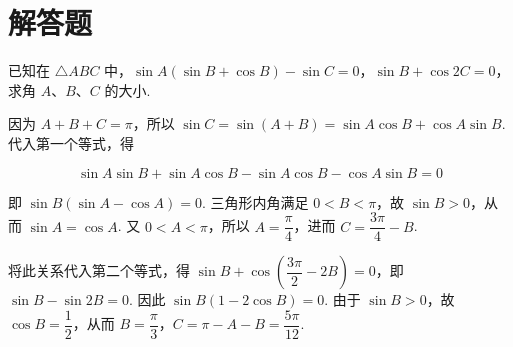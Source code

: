 \section{解答题}
\begin{problem}
已知在 \(\triangle ABC\) 中，\(\sin A (\sin B + \cos B) - \sin C = 0\)，\(\sin B + \cos 2C = 0\)，求角 \(A\)、\(B\)、\(C\) 的大小.

\begin{solution}
因为 \(A+B+C=\pi\)，所以 \(\sin C=\sin(A+B)=\sin A\cos B+\cos A\sin B\). 代入第一个等式，得

\[
\sin A\sin B+\sin A\cos B-\sin A\cos B-\cos A\sin B=0
\]

即 \(\sin B(\sin A-\cos A)=0\). 三角形内角满足 \(0<B<\pi\)，故 \(\sin B>0\)，从而 \(\sin A=\cos A\). 又 \(0<A<\pi\)，所以 \(A=\dfrac{\pi}{4}\)，进而 \(C=\dfrac{3\pi}{4}-B\).

将此关系代入第二个等式，得 \(\sin B+\cos\left(\dfrac{3\pi}{2}-2B\right)=0\)，即 \(\sin B-\sin 2B=0\). 因此 \(\sin B(1-2\cos B)=0\). 由于 \(\sin B>0\)，故 \(\cos B=\dfrac{1}{2}\)，从而 \(B=\dfrac{\pi}{3}\)，\(C=\pi-A-B=\dfrac{5\pi}{12}\).
\end{solution}
\end{problem}

